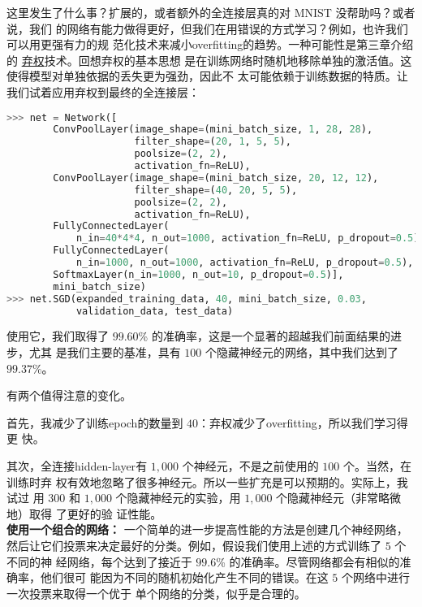 \label{final_conv}
这里发生了什么事？扩展的，或者额外的全连接层真的对 MNIST 没帮助吗？或者说，我们
的网络有能力做得更好，但我们在用错误的方式学习？例如，也许我们可以用更强有力的规
范化技术来减小\gls*{overfitting}的趋势。一种可能性是第三章介绍的%
\hyperref[sec:other_techniques_for_regularization]{弃权}技术。回想弃权的基本思想
是在训练网络时随机地移除单独的激活值。这使得模型对单独依据的丢失更为强劲，因此不
太可能依赖于训练数据的特质。让我们试着应用弃权到最终的全连接层：
\begin{lstlisting}[language=Python]
>>> net = Network([
        ConvPoolLayer(image_shape=(mini_batch_size, 1, 28, 28), 
                      filter_shape=(20, 1, 5, 5), 
                      poolsize=(2, 2), 
                      activation_fn=ReLU),
        ConvPoolLayer(image_shape=(mini_batch_size, 20, 12, 12), 
                      filter_shape=(40, 20, 5, 5), 
                      poolsize=(2, 2), 
                      activation_fn=ReLU),
        FullyConnectedLayer(
            n_in=40*4*4, n_out=1000, activation_fn=ReLU, p_dropout=0.5),
        FullyConnectedLayer(
            n_in=1000, n_out=1000, activation_fn=ReLU, p_dropout=0.5),
        SoftmaxLayer(n_in=1000, n_out=10, p_dropout=0.5)], 
        mini_batch_size)
>>> net.SGD(expanded_training_data, 40, mini_batch_size, 0.03, 
            validation_data, test_data)
\end{lstlisting}

使用它，我们取得了 $99.60$\% 的准确率，这是一个显著的超越我们前面结果的进步，尤其
是我们主要的基准，具有 $100$ 个隐藏神经元的网络，其中我们达到了 $99.37$\%。

有两个值得注意的变化。

首先，我减少了训练\gls*{epoch}的数量到 $40$：弃权减少了\gls*{overfitting}，所以我们学习得更
快。

其次，全连接\gls*{hidden-layer}有 $1,000$ 个神经元，不是之前使用的 $100$ 个。当然，在训练时弃
权有效地忽略了很多神经元。所以一些扩充是可以预期的。实际上，我试过
用 $300$ 和 $1,000$ 个隐藏神经元的实验，用 $1,000$ 个隐藏神经元（非常略微地）取得
了更好的验
证性能。\\

\textbf{使用一个组合的网络：} 一个简单的进一步提高性能的方法是创建几个神经网络，
然后让它们投票来决定最好的分类。例如，假设我们使用上述的方式训练了 $5$ 个不同的神
经网络，每个达到了接近于 $99.6$\% 的准确率。尽管网络都会有相似的准确率，他们很可
能因为不同的随机初始化产生不同的错误。在这 $5$ 个网络中进行一次投票来取得一个优于
单个网络的分类，似乎是合理的。

